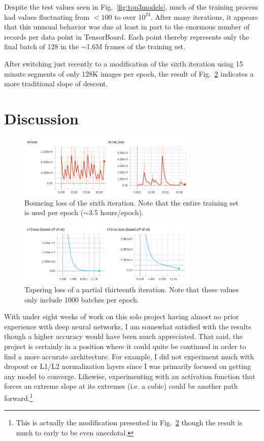 \documentclass[aip, rsi, amsmath, amssymb, reprint, author-year, longbibliography]{revtex4-1}
\begin{document}
Despite the test values seen in Fig.~\ref{fig:top3models}, much of the training
process had values fluctuating from $<100$ to over $10^{24}$. After many
iterations, it appears that this unusual behavior was due at least in part to
the enormous number of records per data point in TensorBoard. Each point
thereby represents only the final batch of 128 in the $\sim$1.6M frames of the
training set.

After switching just recently to a modification of the sixth iteration using 15
minute segments of only 128K images per epoch, the result of
Fig.~\ref{fig:v13taper} indicates a more traditional slope of descent.

\section{\label{sec:level1}Discussion}

\begin{figure}[t]
\includegraphics[height=3cm]{v6-bounce.png}
\caption{\label{fig:v6bounce} Bouncing loss of the sixth iteration. Note that
  the entire training set is used per epoch ($\sim$3.5 hours/epoch).}
\end{figure}

\begin{figure}[t]
\includegraphics[height=3cm]{v13-taper.png}
\caption{\label{fig:v13taper} Tapering loss of a partial thirteenth iteration.
  Note that these values only include 1000 batches per epoch.}
\end{figure}

With under eight weeks of work on this solo project having almost no prior
experience with deep neural networks, I am somewhat satisfied with the results
though a higher accuracy would have been much appreciated. That said, the
project is certainly in a position where it could quite be continued in order to
find a more accurate architecture. For example, I did not experiment much with
dropout or L1/L2 normalization layers since I was primarily focused on getting
any model to converge. Likewise, experimenting with an activation function that
forces an extreme slope at its extremes (i.e. a cubic) could be another path
forward.\footnote{This is actually the modification presented in
  Fig.~\ref{fig:v13taper} though the result is much to early to be even
  anecdotal.}
\end{document}
